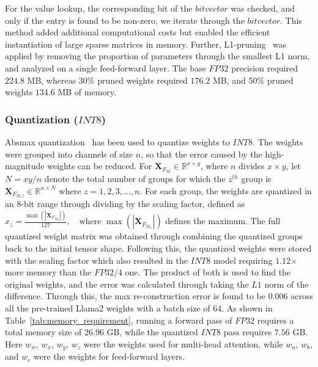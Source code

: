 For the value lookup, the corresponding bit of the $bitvector$ was checked, and only if the entry is found to be non-zero, we iterate through the $bitvector$. 
This method added additional computational costs but enabled the efficient instantiation of large sparse matrices in memory. 
Further, L1-pruning~\cite{l1} was applied by removing the proportion of parameters through the smallest L1 norm, and analyzed on a single feed-forward layer. The base $FP32$ precision required $224.8$ MB, whereas 30\% pruned weights required $176.2$ MB, and 50\% pruned weights $134.6$ MB of memory.


\subsubsection{Quantization ($INT8$)}
\label{subsec:quant} 

Absmax quantization~\cite{dettmers2022gpt3} has been used to quantize weights to $INT8$. The weights were grouped into channels of size $n$, so that the error caused by the high-magnitude weights can be reduced. 
For $\mathbf{X}_{F_{32}} \in \mathbb{R}^{x \times y}$, where $n$ divides ${x \times y}$, let $N={xy}/{n}$ denote the total number of groups for which the $z^{th}$ group is $\mathbf{X}_{F_{32\_z}} \in \mathbb{R}^{n \times N}$ where $z=1,2,3,..., n$. 
For each group, the weights are quantized in an 8-bit range through dividing by the scaling factor, defined as $x_z = \frac{\max(|\mathbf{X}_{F_{32_k}}|)}{127}, \quad \text{where } \max(|\mathbf{X}_{F_{32_z}}|)$ defines the maximum. 
The full quantized weight matrix was obtained through combining the quantized groups back to the initial tensor shape. Following this, the quantized weights were stored with the scaling factor which also resulted in the $INT8$ model requiring $1.12$$\times$ more memory than the $FP32$$/4$ one. 
The product of both is used to find the original weights, and the error was calculated through taking the $L1$ norm of the difference. 
Through this, the max re-construction error is found to be $0.006$ across all the pre-trained Llama2 weights with a batch size of $64$. 
As shown in Table~\ref{tab:memory_requirement}, running a forward pass of $FP32$ requires a total memory size of $26.96$ GB, while the quantized $INT8$ pass requires $7.56$ GB. 
Here $w_w$, $w_x$, $w_y$, $w_z$ were the weights used for multi-head attention, while $w_a$, $w_b$, and $w_c$ were the weights for feed-forward layers.



